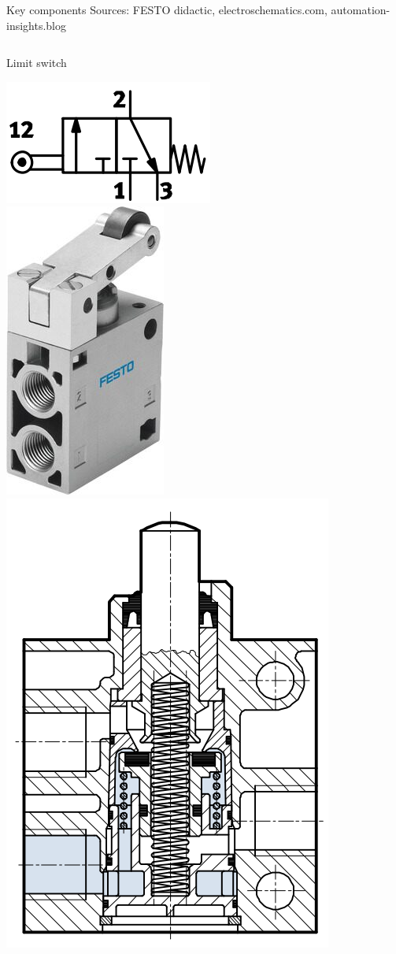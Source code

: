 \documentclass[presentation,aspectratio=1610]{beamer}
\begin{document}
\begin{frame}[label={sec:org46ecc84}]{Key components}
{\tiny Sources: FESTO didactic, electroschematics.com, automation-insights.blog}
\begin{columns}
\begin{column}{0.33\columnwidth}
\begin{block}{Limit switch}
\begin{center}
\includegraphics[width=0.4\linewidth]{../../figures/festo-mech-valve-symbol.png}\\
\includegraphics[width=0.3\linewidth]{../../figures/festo-limit-switch.jpg}\\
\includegraphics[width=0.5\linewidth]{../../figures/festo-mech-valve-section.png}\\
\end{center}
\end{block}
\end{column}



\end{columns}
\end{frame}
\end{document}
